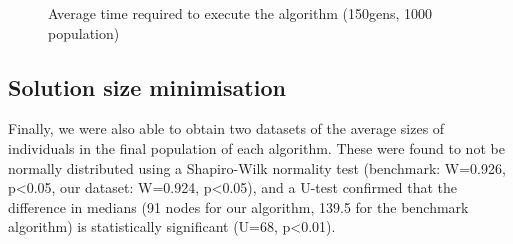 \documentclass[british,10pt,a4paper]{article}
\begin{document}
\begin{figure}
  \vspace{-20pt}
  \begin{center}
	  \vspace{-5pt}
		\caption{Average time required to execute the algorithm (150gens, 1000 population)}
		\label{fig:box_plot_algorithm_time}
	  \vspace{-10pt}
	  \end{center}
\end{figure}

\subsection{Solution size minimisation}
\label{subsec:results_size}

Finally, we were also able to obtain two datasets of the average sizes of individuals in the final population of each algorithm. These were found to not be normally distributed using a Shapiro-Wilk normality test (benchmark: W=0.926, p<0.05, our dataset: W=0.924, p<0.05), and a U-test confirmed that the difference in medians (91 nodes for our algorithm, 139.5 for the benchmark algorithm) is statistically significant (U=68, p<0.01).
\end{document}
